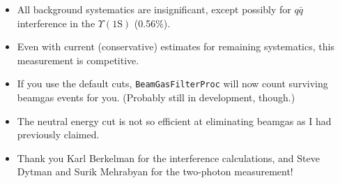 \begin{slide*}
\begin{minipage}[t]{\linewidth}
\vspace{0.1cm}

\end{minipage}

\end{slide*}


\begin{slide*}

\slideframe{}
\huge
{}

\begin{minipage}[t]{\linewidth}
\Large

\vspace{0.5cm}

\begin{itemize}

  \item All background systematics are insignificant, except possibly for 
  $q\bar{q}$ interference in the $\Upsilon(\mbox{1S})$ (0.56\%).

  \vspace{1cm}

  \item Even with current (conservative) estimates for remaining
  systematics, this measurement is competitive.

  \vspace{1cm}

  \item If you use the default cuts, {\tt BeamGasFilterProc} will now
  count surviving beamgas events for you.  (Probably still in
  development, though.)

  \vspace{1cm}

  \item The neutral energy cut is not so efficient at eliminating
  beamgas as I had previously claimed.

  \vspace{1cm}

  \item Thank you Karl Berkelman for the interference calculations,
  and Steve Dytman and Surik Mehrabyan for the two-photon measurement!

\end{itemize}

\end{minipage}

\end{slide*}

